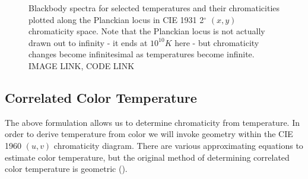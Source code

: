 \documentclass[twocolumn]{article}
\newif\ifinvert
\begin{document}
\begin{figure*}[h]
    \ifinvert
        
    \else
        
    \fi
    \caption{Blackbody spectra for selected temperatures and their chromaticities plotted along the Planckian locus in CIE 1931 2$^\circ$ $(x,y)$ chromaticity space.  Note that the Planckian locus is not actually drawn out to infinity - it ends at $10^{10}K$ here - but chromaticity changes become infinitesimal as temperatures become infinite.  IMAGE LINK, CODE LINK}\label{fig:blackbody_spectra}
\end{figure*}
\subsection{Correlated Color Temperature}
The above formulation allows us to determine chromaticity from temperature.  In order to derive temperature from color we will invoke geometry within the CIE 1960 $(u,v)$ chromaticity diagram.  There are various approximating equations to estimate color temperature, but the original method of determining correlated color temperature is geometric (\cite{kelly1963lines}).
\end{document}
